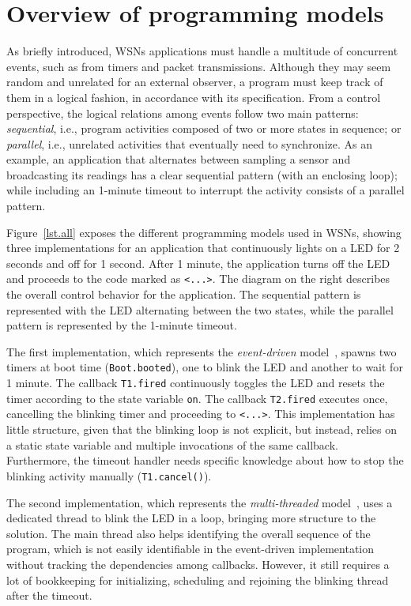 \documentclass[10pt]{sensys-proc}
\newcommand{\code}[1] {{\small{\texttt{#1}}}}
\begin{document}
\section{Overview of programming models}
\label{sec.overview}

As briefly introduced, WSNs applications must handle a multitude of concurrent 
events, such as from timers and packet transmissions.
Although they may seem random and unrelated for an external observer, a
program must keep track of them in a logical fashion, in accordance with its 
specification.
%
From a control perspective, the logical relations among events follow two main 
patterns: \emph{sequential}, i.e., program activities composed of two or more 
states in sequence; or \emph{parallel}, i.e., unrelated activities that 
eventually need to synchronize.
%
As an example, an application that alternates between sampling a sensor and 
broadcasting its readings has a clear sequential pattern (with an enclosing 
loop); while including an 1-minute timeout to interrupt the activity consists 
of a parallel pattern.

Figure~\ref{lst.all} exposes the different programming models used in WSNs, 
showing three implementations for an application that continuously lights on a 
LED for 2 seconds and off for 1 second.
After 1 minute, the application turns off the LED and proceeds to the code 
marked as \code{<...>}.
The diagram on the right describes the overall control behavior for the 
application.
The sequential pattern is represented with the LED alternating between the two 
states, while the parallel pattern is represented by the 1-minute timeout.

The first implementation, which represents the \emph{event-driven} 
model~\cite{wsn.nesc,wsn.contiki}, spawns two timers at boot time 
(\code{Boot.booted}), one to blink the LED and another to wait for 1 minute.
The callback \code{T1.fired} continuously toggles the LED and resets the timer 
according to the state variable \code{on}.
The callback \code{T2.fired} executes once, cancelling the blinking timer and 
proceeding to \code{<...>}.
This implementation has little structure, given that the blinking loop is not 
explicit, but instead, relies on a static state variable and multiple 
invocations of the same callback.
Furthermore, the timeout handler needs specific knowledge about how to stop the 
blinking activity manually (\code{T1.cancel()}).

The second implementation, which represents the \emph{multi-threaded} 
model~\cite{wsn.protothreads,wsn.mantisos}, uses a dedicated thread to blink 
the LED in a loop, bringing more structure to the solution.
The main thread also helps identifying the overall sequence of the program, 
which is not easily identifiable in the event-driven implementation without 
tracking the dependencies among callbacks.
However, it still requires a lot of bookkeeping for initializing, scheduling 
and rejoining the blinking thread after the timeout.
\end{document}
